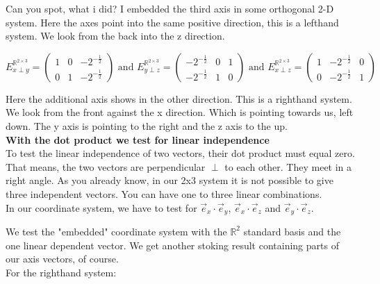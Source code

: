 \documentclass[a4paper]{article}
\begin{document}
\begin{PropositionOpt4}
Can you spot, what i did? I embedded the third axis in some orthogonal 2-D system. Here the axes point into the same positive direction, this is a lefthand system. We look from the back into the z direction.


\begin{displaymath}
    E^{\mathbb{R}^{2\times{3}}}_{x\perp y} = \begin{pmatrix}1&0&-2^{-\frac12}\\0&1&-2^{-\frac12}\end{pmatrix} \mbox{ and }
    E^{\mathbb{R}^{2\times{3}}}_{y\perp z} = \begin{pmatrix}-2^{-\frac12}&0&1\\-2^{-\frac12}&1&0\end{pmatrix} \mbox{ and }
    E^{\mathbb{R}^{2\times{3}}}_{x\perp z} = \begin{pmatrix}1&-2^{-\frac12}&0\\0&-2^{-\frac12}&1\end{pmatrix} 
\end{displaymath}

Here the additional axis shows in the other direction. This is a righthand system. We look from the front against the x direction.
Which is pointing towards us, left down. The y axis is pointing to the right and the z axis to the up.\\

\textbf{With the dot product we test for linear independence}\\

To test the linear independence of two vectors, their dot product must equal zero.\\
That means, the two vectors are perpendicular $\perp$ to each other. They meet in a right angle. As you already know, 
in our 2x3 system it is not possible to give three independent vectors. You can have one to three linear combinations.\\


In our coordinate system, we have to test for $\vec{e}_{x}\cdot\vec{e}_{y}$, $\vec{e}_{x}\cdot\vec{e}_{z}$ and $\vec{e}_{y}\cdot\vec{e}_{z}$.

We test the "embedded" coordinate system with the $\mathbb{R}^{2}$ standard basis and the one linear dependent vector. We 
get another stoking result containing parts of our axis vectors, of course.\\

For the righthand system:\\


\end{PropositionOpt4}
\end{document}
